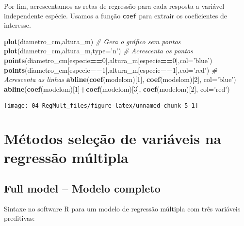 \documentclass[12pt,brazil,oneside]{book}
\newenvironment{Shaded}{\begin{snugshade}}{\end{snugshade}}
\newcommand{\CommentTok}[1]{\textcolor[rgb]{0.56,0.35,0.01}{\textit{#1}}}
\newcommand{\DataTypeTok}[1]{\textcolor[rgb]{0.13,0.29,0.53}{#1}}
\newcommand{\DecValTok}[1]{\textcolor[rgb]{0.00,0.00,0.81}{#1}}
\newcommand{\KeywordTok}[1]{\textcolor[rgb]{0.13,0.29,0.53}{\textbf{#1}}}
\newcommand{\NormalTok}[1]{#1}
\newcommand{\OperatorTok}[1]{\textcolor[rgb]{0.81,0.36,0.00}{\textbf{#1}}}
\newcommand{\StringTok}[1]{\textcolor[rgb]{0.31,0.60,0.02}{#1}}
\begin{document}
Por fim, acrescentamos as retas de regressão para cada resposta a
variável independente espécie. Usamos a função \texttt{coef} para
extrair os coeficientes de interesse.

\begin{Shaded}
\begin{Highlighting}[]
\KeywordTok{plot}\NormalTok{(diametro_cm,altura_m)}
\CommentTok{# Gera o gráfico sem pontos}
\KeywordTok{plot}\NormalTok{(diametro_cm,altura_m,}\DataTypeTok{type=}\StringTok{'n'}\NormalTok{) }
\CommentTok{# Acrescenta os pontos}
\KeywordTok{points}\NormalTok{(diametro_cm[especie}\OperatorTok{==}\DecValTok{0}\NormalTok{],altura_m[especie}\OperatorTok{==}\DecValTok{0}\NormalTok{],}\DataTypeTok{col=}\StringTok{'blue'}\NormalTok{)}
\KeywordTok{points}\NormalTok{(diametro_cm[especie}\OperatorTok{==}\DecValTok{1}\NormalTok{],altura_m[especie}\OperatorTok{==}\DecValTok{1}\NormalTok{],}\DataTypeTok{col=}\StringTok{'red'}\NormalTok{)}
\CommentTok{# Acrescenta as linhas}
\KeywordTok{abline}\NormalTok{(}\KeywordTok{coef}\NormalTok{(modelom)[}\DecValTok{1}\NormalTok{], }\KeywordTok{coef}\NormalTok{(modelom)[}\DecValTok{2}\NormalTok{], }\DataTypeTok{col=}\StringTok{'blue'}\NormalTok{)}
\KeywordTok{abline}\NormalTok{(}\KeywordTok{coef}\NormalTok{(modelom)[}\DecValTok{1}\NormalTok{]}\OperatorTok{+}\KeywordTok{coef}\NormalTok{(modelom)[}\DecValTok{3}\NormalTok{], }\KeywordTok{coef}\NormalTok{(modelom)[}\DecValTok{2}\NormalTok{], }\DataTypeTok{col=}\StringTok{'red'}\NormalTok{)}
\end{Highlighting}
\end{Shaded}

\begin{center}\texttt{[image: 04-RegMult\_files/figure-latex/unnamed-chunk-5-1]} \end{center}

\hypertarget{metodos-selecao-de-variaveis-na-regressao-multipla}{%
\section{Métodos seleção de variáveis na regressão
múltipla}\label{metodos-selecao-de-variaveis-na-regressao-multipla}}

\hypertarget{full-model-modelo-completo}{%
\subsection{Full model -- Modelo
completo}\label{full-model-modelo-completo}}

Sintaxe no software R para um modelo de regressão múltipla com três
variáveis preditivas:
\end{document}
